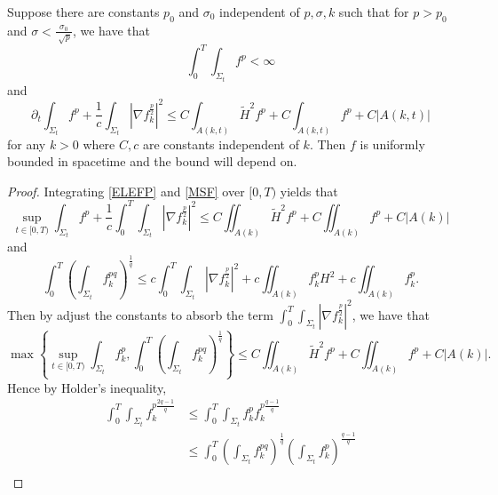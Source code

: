 \begin{theorem}
    Suppose there are constants $p_0$ and $\sigma _0$ independent of $p, \sigma , k$ such that for $p>p_0$ and $\sigma < \frac{\sigma _0}{\sqrt[]{p}}$, we have that 
    \[\int_{0}^{T}\int_{\Sigma_t} f^p < \infty \]
    and
    \begin{equation} \label{ELEFP}
        \partial _t \int_{\Sigma_t} f^p + \frac{1}{c} \int_{\Sigma_t} \left| \nabla f_{k}^{\frac{p}{2}}  \right| ^2 \leq C \int_{A(k,t)}^{} \tilde{H}^2 f^p +C \int_{A(k,t)}^{}f^p + C \left| A(k,t) \right| 
    \end{equation}
    for any $k>0$ where $C,c$ are constants independent of $k$.
    Then $f$ is uniformly bounded in spacetime and the bound will depend on.
\end{theorem}

\begin{proof}
    Integrating \autoref{ELEFP} and \autoref{MSF} over $[0,T)$ yields that 
    \begin{equation*}
        \sup _{t \in [0,T)} \int_{\Sigma_t} f^p + \frac{1}{c} \int_{0}^{T}\int_{\Sigma_t} \left| \nabla f_{k}^{\frac{p}{2}}  \right| ^2 \leq C \iint_{A(k)}^{} \tilde{H}^2 f^p +C \iint_{A(k)}^{}f^p + C \left| A(k) \right| 
    \end{equation*}
    and
    \begin{equation*}
        \int_{0}^{T} \left(\int_{\Sigma_t} f_{k}^{pq} \right) ^{\frac{1}{q}} \leq c \int_{0}^{T}\int_{\Sigma_t} \left| \nabla f_{k}^{\frac{p}{2}} \right| ^2 + c \iint_{A(k)} f_{k}^{p} H^2 + c \iint_{A(k)} f_{k}^{p}.
    \end{equation*}
    Then by adjust the constants to absorb the term $\int_{0}^{T}\int_{\Sigma_t} \left| \nabla f_{k}^{\frac{p}{2}} \right| ^2$, we have that
    \begin{equation}
        \max \left\{ \sup _{t \in [0,T)} \int_{\Sigma_t} f_{k}^{p}, \int_{0}^{T} \left(\int_{\Sigma_t} f_{k}^{pq} \right) ^{\frac{1}{q}}  \right\} \leq C \iint_{A(k)}^{} \tilde{H}^2 f^p +C \iint_{A(k)}^{}f^p + C \left| A(k) \right|.
    \end{equation}
    Hence by Holder's inequality,
    \begin{equation} \label{SIE}
    \begin{split}
        \int_{0}^{T} \int_{\Sigma_t} f_{k}^{p \frac{2q-1}{q}}  
    &\leq  \int_{0}^{T} \int_{\Sigma_t} f_{k}^{p} f_{k}^{p \frac{q-1}{q}}  \\
    & \leq \int_{0}^{T} \left( \int_{\Sigma_t} f_{k}^{pq}  \right) ^{\frac{1}{q}} \left( \int_{\Sigma_t} f_{k}^{p}  \right) ^{\frac{q-1}{q}}\\

\end{split}
\end{equation}
\end{proof}
